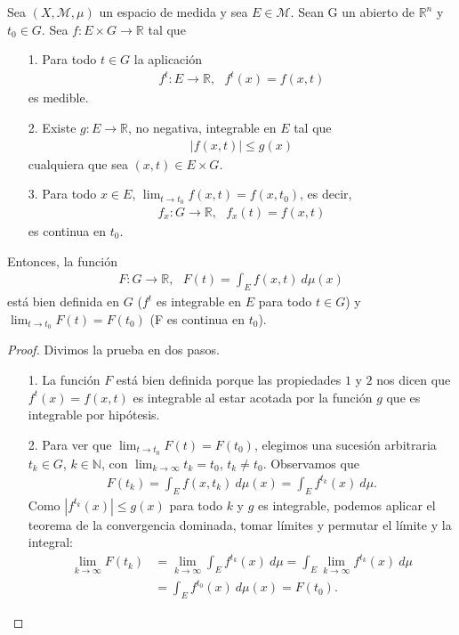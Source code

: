 \begin{teo}
Sea $(X, \mathcal{M}, \mu)$ un espacio de medida y sea $E \in \mathcal{M}$. Sean G un abierto de $\mathbb{R}^n$ y $t_0 \in G$. Sea $f: E \times G \longrightarrow \mathbb{R}$ tal que
\begin{enumerate}
    \item[1.] Para todo $t \in G$ la aplicación
    \begin{align*}
        f^t: E \longrightarrow \mathbb{R}, \ \ \ f^t(x) = f(x,t)
    \end{align*}
    es medible.
    \item[2.] Existe $g: E \longrightarrow \mathbb{R}$, no negativa, integrable en $E$ tal que
    \begin{align*}
        |f(x,t)| \leq g(x)
    \end{align*}
    cualquiera que sea $(x,t) \in E \times G$.
    \item[3.] Para todo $x \in E$, $\lim_{t \to t_0}{f(x,t)} = f(x,t_0)$, es decir,
    \begin{align*}
        f_x : G \longrightarrow \mathbb{R}, \ \ \ f_x(t) = f(x,t)
    \end{align*}
    es continua en $t_0$.
\end{enumerate}
Entonces, la función
\begin{align*}
    F: G \longrightarrow \mathbb{R}, \ \ \ F(t) = \int_{E}{f(x,t) \ d\mu(x)}
\end{align*}
está bien definida en $G$ ($f^t$ es integrable en $E$ para todo $t \in G$) y $\lim_{t \to t_0}{F(t)} = F(t_0)$ (F es continua en $t_0$).
\end{teo}

\begin{proof}
Divimos la prueba en dos pasos.
\begin{enumerate}
    \item[1.] La función $F$ está bien definida porque las propiedades $1$ y $2$ nos dicen que $f^t(x) = f(x,t)$ es integrable al estar acotada por la función $g$ que es integrable por hipótesis.
    \item[2.] Para ver que  $\lim_{t \to t_0}{F(t)} = F(t_0)$, elegimos una sucesión arbitraria $t_k \in G$, $k \in \mathbb{N}$, con $\lim_{k \to \infty}{t_k} = t_0$, $t_k \not = t_0$. Observamos que
    \begin{align*}
        F(t_k) = \int_{E}{f(x,t_k) \ d\mu(x)} = \int_{E}{f^{t_k}(x) \ d\mu}.
    \end{align*}
    Como $|f^{t_k}(x)| \leq g(x)$ para todo $k$ y $g$ es integrable, podemos aplicar el teorema de la convergencia dominada, tomar límites y permutar el límite y la integral:
    \begin{align*}
        \lim_{k \to \infty}{F(t_k)} &= \lim_{k \to \infty}{\int_{E}{f^{t_k}(x) \ d\mu}} = \int_{E}{\lim_{k \to \infty}{}f^{t_k}(x) \ d\mu}\\
        &= \int_{E}{f^{t_0}(x) \ d\mu(x)} = F(t_0).
    \end{align*}
\end{enumerate}
\end{proof}

